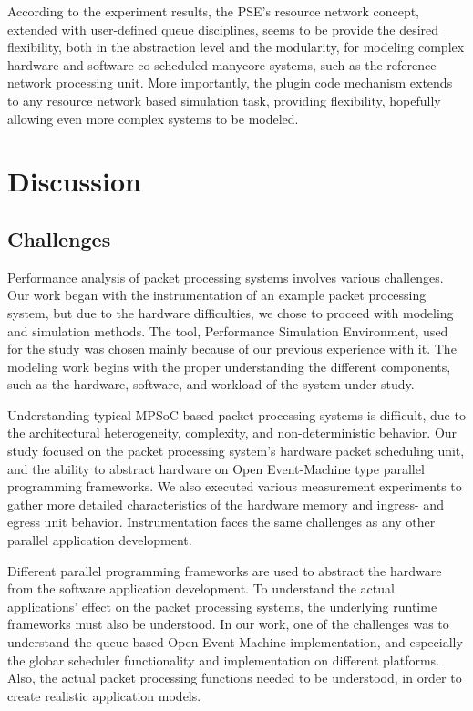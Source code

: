 According to the experiment results, the PSE's resource network concept, extended with user-defined queue disciplines, seems to be provide the desired flexibility, both in the abstraction level and the modularity, for modeling complex hardware and software co-scheduled manycore systems, such as the reference network processing unit. More importantly, the plugin code mechanism extends to any resource network based simulation task, providing flexibility, hopefully allowing even more complex systems to be modeled.

\section{Discussion}

\subsection{Challenges}
Performance analysis of packet processing systems involves various challenges. Our work began with the instrumentation of an example packet processing system, but due to the hardware difficulties, we chose to proceed with modeling and simulation methods. The tool, Performance Simulation Environment, used for the study was chosen mainly because of our previous experience with it. The modeling work begins with the proper understanding the different components, such as the hardware, software, and workload of the system under study.

Understanding typical MPSoC based packet processing systems is difficult, due to the architectural heterogeneity, complexity, and non-deterministic behavior. Our study focused on the packet processing system's hardware packet scheduling unit, and the ability to abstract hardware on Open Event-Machine type parallel programming frameworks. We also executed various measurement experiments to gather more detailed characteristics of the hardware memory and ingress- and egress unit behavior. Instrumentation faces the same challenges as any other parallel application development.

Different parallel programming frameworks are used to abstract the hardware from the software application development. To understand the actual applications' effect on the packet processing systems, the underlying runtime frameworks must also be understood. In our work, one of the challenges was to understand the queue based Open Event-Machine implementation, and especially the globar scheduler functionality and implementation on different platforms. Also, the actual packet processing functions needed to be understood, in order to create realistic application models.

